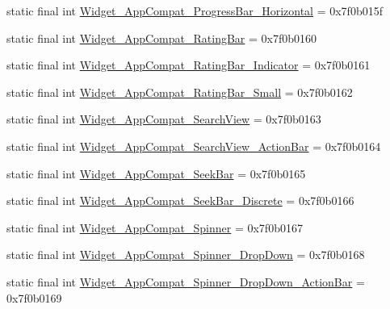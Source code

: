 \begin{CompactItemize}
\item 
static final int \hyperlink{classandroid_1_1support_1_1graphics_1_1drawable_1_1animated_1_1_r_1_1style_3a925099396e14991599368081772d75}{Widget\_\-AppCompat\_\-ProgressBar\_\-Horizontal} = 0x7f0b015f
\item 
static final int \hyperlink{classandroid_1_1support_1_1graphics_1_1drawable_1_1animated_1_1_r_1_1style_2db5c3e8f6acf068cb1510cf4a6789b4}{Widget\_\-AppCompat\_\-RatingBar} = 0x7f0b0160
\item 
static final int \hyperlink{classandroid_1_1support_1_1graphics_1_1drawable_1_1animated_1_1_r_1_1style_a4ea1565813be5564f1e3992aab9397b}{Widget\_\-AppCompat\_\-RatingBar\_\-Indicator} = 0x7f0b0161
\item 
static final int \hyperlink{classandroid_1_1support_1_1graphics_1_1drawable_1_1animated_1_1_r_1_1style_e410681fd8dc0ed6bd547bb431499e5e}{Widget\_\-AppCompat\_\-RatingBar\_\-Small} = 0x7f0b0162
\item 
static final int \hyperlink{classandroid_1_1support_1_1graphics_1_1drawable_1_1animated_1_1_r_1_1style_a923addf9a62405f70a73ab7fa940159}{Widget\_\-AppCompat\_\-SearchView} = 0x7f0b0163
\item 
static final int \hyperlink{classandroid_1_1support_1_1graphics_1_1drawable_1_1animated_1_1_r_1_1style_d5ffda6829711336ffcb9d0a8dcef7b7}{Widget\_\-AppCompat\_\-SearchView\_\-ActionBar} = 0x7f0b0164
\item 
static final int \hyperlink{classandroid_1_1support_1_1graphics_1_1drawable_1_1animated_1_1_r_1_1style_416bce9ea7945e8c35550e50c9e2bd5f}{Widget\_\-AppCompat\_\-SeekBar} = 0x7f0b0165
\item 
static final int \hyperlink{classandroid_1_1support_1_1graphics_1_1drawable_1_1animated_1_1_r_1_1style_aead8d93554d09eea522f52590714926}{Widget\_\-AppCompat\_\-SeekBar\_\-Discrete} = 0x7f0b0166
\item 
static final int \hyperlink{classandroid_1_1support_1_1graphics_1_1drawable_1_1animated_1_1_r_1_1style_6444c7a8a7539710f162777f81ed1450}{Widget\_\-AppCompat\_\-Spinner} = 0x7f0b0167
\item 
static final int \hyperlink{classandroid_1_1support_1_1graphics_1_1drawable_1_1animated_1_1_r_1_1style_e7b98e816b73a2fb7a96f693088e7eb2}{Widget\_\-AppCompat\_\-Spinner\_\-DropDown} = 0x7f0b0168
\item 
static final int \hyperlink{classandroid_1_1support_1_1graphics_1_1drawable_1_1animated_1_1_r_1_1style_dc35310aef672fd20c05e84df21dbea0}{Widget\_\-AppCompat\_\-Spinner\_\-DropDown\_\-ActionBar} = 0x7f0b0169

\end{CompactItemize}
